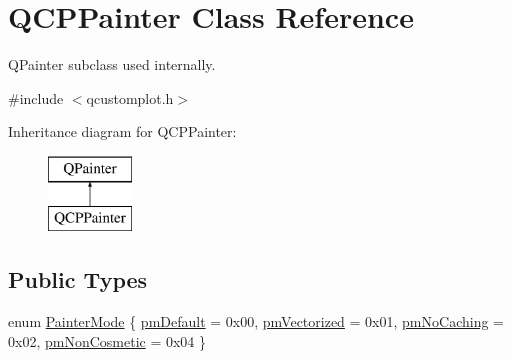 \hypertarget{class_q_c_p_painter}{}\section{Q\+C\+P\+Painter Class Reference}
\label{class_q_c_p_painter}


Q\+Painter subclass used internally.  




{\ttfamily \#include $<$qcustomplot.\+h$>$}

Inheritance diagram for Q\+C\+P\+Painter\+:\begin{figure}[H]
\begin{center}
\leavevmode
\includegraphics[height=2.000000cm]{d3/db4/class_q_c_p_painter}
\end{center}
\end{figure}
\subsection*{Public Types}
\begin{DoxyCompactItemize}
\item 
enum \mbox{\hyperlink{class_q_c_p_painter_a156cf16444ff5e0d81a73c615fdb156d}{Painter\+Mode}} \{ \mbox{\hyperlink{class_q_c_p_painter_a156cf16444ff5e0d81a73c615fdb156da3bac5e87e3d58553b297befb4eee2a45}{pm\+Default}} = 0x00, 
\mbox{\hyperlink{class_q_c_p_painter_a156cf16444ff5e0d81a73c615fdb156daeda679cd55dcd468341d07d48a30b6ab}{pm\+Vectorized}} = 0x01, 
\mbox{\hyperlink{class_q_c_p_painter_a156cf16444ff5e0d81a73c615fdb156dae78f9a4eb277a5f9207f50850a51a0b0}{pm\+No\+Caching}} = 0x02, 
\mbox{\hyperlink{class_q_c_p_painter_a156cf16444ff5e0d81a73c615fdb156dac1e481bfaf408f2bd2eaad3ec341f36b}{pm\+Non\+Cosmetic}} = 0x04
 \}
\end{DoxyCompactItemize}
